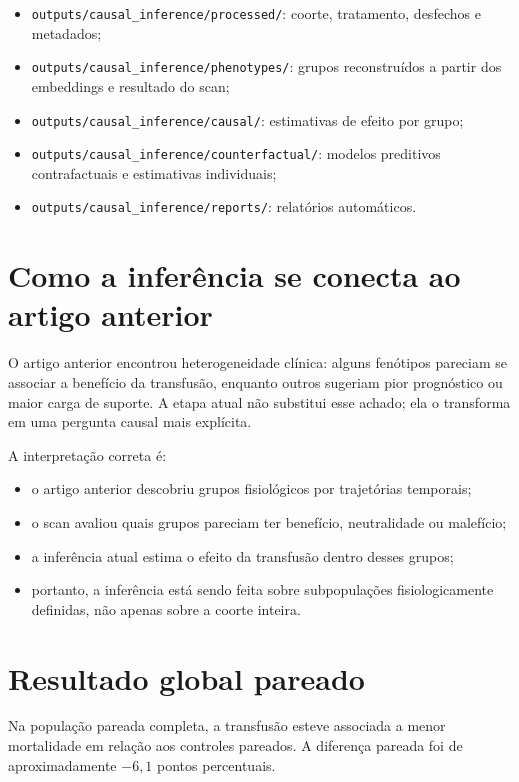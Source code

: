 \documentclass[12pt,a4paper]{article}
\begin{document}
\begin{itemize}
    \item \texttt{outputs/causal\_inference/processed/}: coorte, tratamento, desfechos e metadados;
    \item \texttt{outputs/causal\_inference/phenotypes/}: grupos reconstru\'idos a partir dos embeddings e resultado do scan;
    \item \texttt{outputs/causal\_inference/causal/}: estimativas de efeito por grupo;
    \item \texttt{outputs/causal\_inference/counterfactual/}: modelos preditivos contrafactuais e estimativas individuais;
    \item \texttt{outputs/causal\_inference/reports/}: relat\'orios autom\'aticos.
\end{itemize}

\section{Como a infer\^encia se conecta ao artigo anterior}

O artigo anterior encontrou heterogeneidade cl\'inica: alguns fen\'otipos pareciam se associar a benef\'icio da transfus\~ao, enquanto outros sugeriam pior progn\'ostico ou maior carga de suporte. A etapa atual n\~ao substitui esse achado; ela o transforma em uma pergunta causal mais expl\'icita.

A interpreta\c{c}\~ao correta \'e:

\begin{itemize}
    \item o artigo anterior descobriu grupos fisiol\'ogicos por trajet\'orias temporais;
    \item o scan avaliou quais grupos pareciam ter benef\'icio, neutralidade ou malef\'icio;
    \item a infer\^encia atual estima o efeito da transfus\~ao dentro desses grupos;
    \item portanto, a infer\^encia est\'a sendo feita sobre subpopula\c{c}\~oes fisiologicamente definidas, n\~ao apenas sobre a coorte inteira.
\end{itemize}

\section{Resultado global pareado}

Na popula\c{c}\~ao pareada completa, a transfus\~ao esteve associada a menor mortalidade em rela\c{c}\~ao aos controles pareados. A diferen\c{c}a pareada foi de aproximadamente $-6{,}1$ pontos percentuais.
\end{document}

